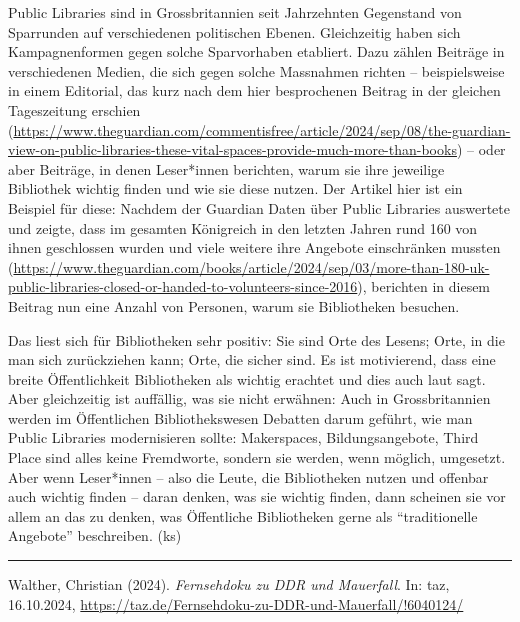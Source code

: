 \documentclass[a4paper,
fontsize=11pt,
oneside,
numbers=noperiodatend,
parskip=half-,
bibliography=totoc,
final
]{scrartcl}
\begin{document}
Public Libraries sind in Grossbritannien seit Jahrzehnten Gegenstand von
Sparrunden auf verschiedenen politischen Ebenen. Gleichzeitig haben sich
Kampagnenformen gegen solche Sparvorhaben etabliert. Dazu zählen
Beiträge in verschiedenen Medien, die sich gegen solche Massnahmen
richten -- beispielsweise in einem Editorial, das kurz nach dem hier
besprochenen Beitrag in der gleichen Tageszeitung erschien
(\url{https://www.theguardian.com/commentisfree/article/2024/sep/08/the-guardian-view-on-public-libraries-these-vital-spaces-provide-much-more-than-books})
-- oder aber Beiträge, in denen Leser*innen berichten, warum sie ihre
jeweilige Bibliothek wichtig finden und wie sie diese nutzen. Der
Artikel hier ist ein Beispiel für diese: Nachdem der Guardian Daten über
Public Libraries auswertete und zeigte, dass im gesamten Königreich in
den letzten Jahren rund 160 von ihnen geschlossen wurden und viele
weitere ihre Angebote einschränken mussten
(\url{https://www.theguardian.com/books/article/2024/sep/03/more-than-180-uk-public-libraries-closed-or-handed-to-volunteers-since-2016}),
berichten in diesem Beitrag nun eine Anzahl von Personen, warum sie
Bibliotheken besuchen.

Das liest sich für Bibliotheken sehr positiv: Sie sind Orte des Lesens;
Orte, in die man sich zurückziehen kann; Orte, die sicher sind. Es ist
motivierend, dass eine breite Öffentlichkeit Bibliotheken als wichtig
erachtet und dies auch laut sagt. Aber gleichzeitig ist auffällig, was
sie nicht erwähnen: Auch in Grossbritannien werden im Öffentlichen
Bibliothekswesen Debatten darum geführt, wie man Public Libraries
modernisieren sollte: Makerspaces, Bildungsangebote, Third Place sind
alles keine Fremdworte, sondern sie werden, wenn möglich, umgesetzt.
Aber wenn Leser*innen -- also die Leute, die Bibliotheken nutzen und
offenbar auch wichtig finden -- daran denken, was sie wichtig finden,
dann scheinen sie vor allem an das zu denken, was Öffentliche
Bibliotheken gerne als \enquote{traditionelle Angebote} beschreiben.
(ks)

\begin{center}\rule{0.5\linewidth}{0.5pt}\end{center}

Walther, Christian (2024). \emph{Fernsehdoku zu DDR und Mauerfall}. In:
taz, 16.10.2024,
\url{https://taz.de/Fernsehdoku-zu-DDR-und-Mauerfall/!6040124/}
\end{document}
